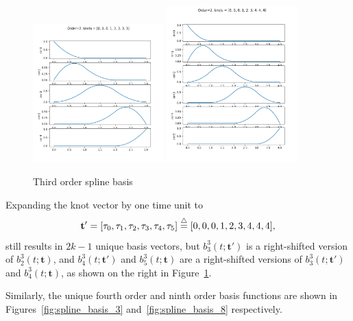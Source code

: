 \begin{figure}[hbt]
  \centering
  	\includegraphics[width=0.45\textwidth]{./chap5_trajectory_planning/figures/spline_basis_2}
  	\includegraphics[width=0.45\textwidth]{./chap5_trajectory_planning/figures/spline_basis_2_extra_knot}
  \caption{Third order spline basis}
  \label{fig:spline_basis_2}  
\end{figure}
Expanding the knot vector by one time unit to 
\[
\mathbf{t}' = [\tau_0, \tau_1, \tau_2, \tau_3, \tau_4, \tau_5] \stackrel{\triangle}{=} [0, 0, 0, 1, 2, 3, 4, 4, 4],
\]
still results in $2k-1$ unique basis vectors, but $b_3^3(t; \mathbf{t}')$ is a right-shifted version of $b_2^3(t; \mathbf{t})$, and $b_4^3(t; \mathbf{t}')$ and $b_5^3(t; \mathbf{t})$ are a right-shifted versions of $b_3^3(t; \mathbf{t}')$ and $b_4^3(t; \mathbf{t})$, as shown on the right in Figure~\ref{fig:spline_basis_2}.

Similarly, the unique fourth order and ninth order basis functions are shown in Figures~\ref{fig:spline_basis_3} and~\ref{fig:spline_basis_8} respectively.


